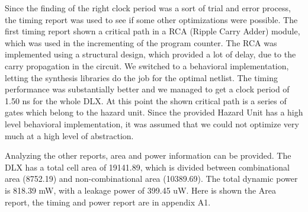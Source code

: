 Since the finding of the right clock period was a sort of trial and error process, the timing report was used to see if some other optimizations were possible.
The first timing report shown a critical path in a RCA (Ripple Carry Adder) module, which was used in the incrementing of the program counter.
The RCA was implemented using a structural design, which provided a lot of delay, due to the carry propagation in the circuit.
We switched to a behavioral implementation, letting the synthesis libraries do the job for the optimal netlist. The timing performance was substantially better and we managed
to get a clock period of 1.50 ns for the whole DLX.
At this point the shown critical path is a series of gates which belong to the hazard unit. Since the provided Hazard Unit has a high level behavioral implementation, it was assumed that we could not
optimize very much at a high level of abstraction.

Analyzing the other reports, area and power information can be provided.
The DLX has a total cell area of 19141.89, which is divided between combinational area (8752.19) and non-combinational area (10389.69).
The total dynamic power is 818.39 mW, with a leakage power of 399.45 uW.
Here is shown the Area report, the timing and power report are in appendix A1.



